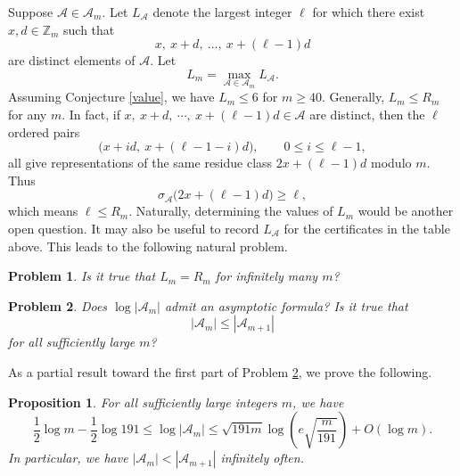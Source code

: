 \documentclass[12pt,a4paper,reqno]{amsart}
\numberwithin{equation}{section}
\theoremstyle{plain}
\newtheorem{problem}{Problem}
\newtheorem{proposition}{Proposition}
\theoremstyle{definition}
\begin{document}
Suppose $\mathcal{A}\in \mathscr{A}_m$. Let $L_{\mathcal{A}}$ denote the largest integer $\ell$ for which there exist $x,d\in\mathbb Z_m$ such that
\[
x,\ x+d,\ \ldots,\ x+(\ell-1)d
\]
are distinct elements of $\mathcal A$. Let
$$
L_m=\max_{\mathcal{A}\in \mathscr{A}_m}L_{\mathcal{A}}.
$$
Assuming Conjecture \ref{value}, we have
$L_m\le 6$ for $m\ge 40$. Generally, $L_m\le R_m$ for any $m$.
In fact, if 
$
x,\ x+d,\ \cdots,\ x+(\ell-1)d \in \mathcal{A}
$
are distinct, then the $\ell$ ordered pairs
\[
\big(x+id,\ x+(\ell-1-i)d\big),\qquad 0\le i\le \ell-1,
\]
all give representations of the same residue class $2x+(\ell-1)d$ modulo $m$. Thus
$$
\sigma_{\mathcal{A}}\big(2x+(\ell-1)d\big)\ge \ell,
$$
which means $\ell\le R_m$.
Naturally, determining the values of $L_m$ would be another open question. It may also be useful to record $L_{\mathcal A}$ for the certificates in the table above. This leads to the following natural problem.
\begin{problem}\label{probl:4}
Is it true that $L_m=R_m$ for infinitely many $m$?
\end{problem}

\begin{problem}\label{probl:5}
    Does $\log |\mathscr{A}_m|$ admit an asymptotic formula? 
    Is it true that
    $$
    |\mathscr{A}_m|\le |\mathscr{A}_{m+1}|
    $$ for all sufficiently large $m$? 
\end{problem}

As a partial result toward the first part of Problem \ref{probl:5}, we prove the following.
\begin{proposition}\label{pro-prob-new-1}
For all sufficiently large integers $m$, we have
\[
    \frac12\log m-\frac12\log 191
    \le
    \log |\mathscr A_m|
    \le
    \sqrt{191m}\log\!\left(e\sqrt{\frac m{191}}\right)+O(\log m).
\]
In particular, we have
\(
    |\mathscr{A}_m|< |\mathscr{A}_{m+1}|
\)
infinitely often.
\end{proposition}
\end{document}
